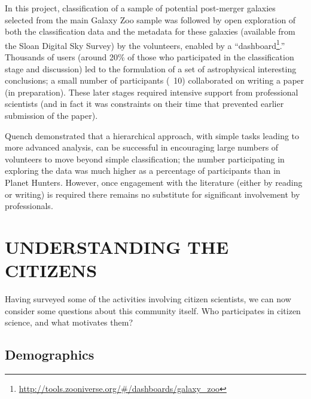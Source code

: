 \documentclass{ar2e}
\begin{document}
In this project, classification of a sample of potential post-merger galaxies
selected from the main Galaxy Zoo sample was followed by open exploration of
both the classification data and the metadata for these galaxies (available from
the Sloan Digital Sky Survey) by the volunteers, enabled by a
``dashboard\footnote{\url{http://tools.zooniverse.org/\#/dashboards/galaxy\_zoo}}.''
Thousands of users (around 20\% of those who participated in the classification
stage and discussion) led to the formulation of a set of astrophysical
interesting conclusions; a small number of participants (~10) collaborated on
writing a paper (in preparation). These later stages required intensive support
from professional scientists (and in fact it was constraints on their time that
prevented earlier submission of the paper). 

Quench demonstrated that a hierarchical approach, with simple tasks leading to
more advanced analysis, can be successful in encouraging large numbers of
volunteers to move beyond simple classification; the number participating in
exploring the data was much higher as a percentage of participants than in
Planet Hunters. However, once engagement with the literature (either by reading
or writing) is required there remains no substitute for significant involvement
by professionals. 



% 




\section{UNDERSTANDING THE CITIZENS}
\label{sec:crowd}

Having surveyed some of the activities involving citizen scientists, we can
now consider some questions about this community itself. Who participates in
citizen science, and what motivates them?



\subsection{Demographics}
\label{sec:crowd:demographics}
\end{document}
